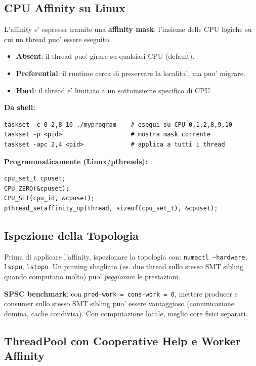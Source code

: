 \documentclass[11pt,a4paper]{article}
\theoremstyle{remark}
\begin{document}
\subsection{CPU Affinity su Linux}

L'affinity e' espressa tramite una \textbf{affinity mask}: l'insieme delle CPU logiche su cui un thread puo' essere eseguito.

\begin{itemize}
  \item \textbf{Absent}: il thread puo' girare su qualsiasi CPU (default).
  \item \textbf{Preferential}: il runtime cerca di preservare la localita', ma puo' migrare.
  \item \textbf{Hard}: il thread e' limitato a un sottoinsieme specifico di CPU.
\end{itemize}

\textbf{Da shell:}
\begin{lstlisting}[style=bash]
taskset -c 0-2,8-10 ./myprogram    # esegui su CPU 0,1,2,8,9,10
taskset -p <pid>                   # mostra mask corrente
taskset -apc 2,4 <pid>             # applica a tutti i thread
\end{lstlisting}

\textbf{Programmaticamente (Linux/pthreads):}
\begin{lstlisting}[style=cpp]
cpu_set_t cpuset;
CPU_ZERO(&cpuset);
CPU_SET(cpu_id, &cpuset);
pthread_setaffinity_np(thread, sizeof(cpu_set_t), &cpuset);
\end{lstlisting}

\subsection{Ispezione della Topologia}

Prima di applicare l'affinity, ispezionare la topologia con: \texttt{numactl --hardware}, \texttt{lscpu}, \texttt{lstopo}. Un pinning sbagliato (es. due thread sullo stesso SMT sibling quando computano molto) puo' \emph{peggiorare} le prestazioni.

\textbf{SPSC benchmark}: con \texttt{prod-work = cons-work = 0}, mettere producer e consumer sullo stesso SMT sibling puo' essere vantaggioso (comunicazione domina, cache condivisa). Con computazione locale, meglio core fisici separati.

\subsection{ThreadPool con Cooperative Help e Worker Affinity}
\end{document}
